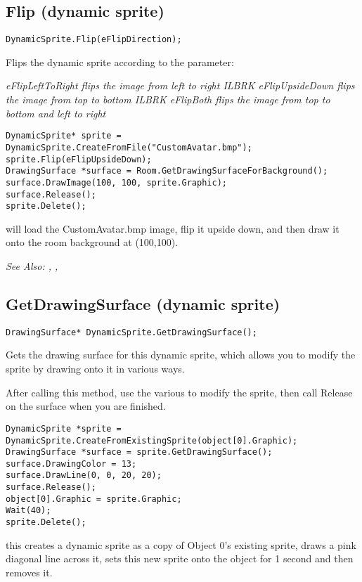\subsection{Flip (dynamic sprite)}\label{DynamicSprite.Flip}%

\begin{verbatim}
DynamicSprite.Flip(eFlipDirection);
\end{verbatim}
Flips the dynamic sprite according to the parameter:

\it{eFlipLeftToRight} flips the image from left to right ILBRK
\it{eFlipUpsideDown} flips the image from top to bottom ILBRK
\it{eFlipBoth} flips the image from top to bottom and left to right

\begin{verbatim}
DynamicSprite* sprite = DynamicSprite.CreateFromFile("CustomAvatar.bmp");
sprite.Flip(eFlipUpsideDown);
DrawingSurface *surface = Room.GetDrawingSurfaceForBackground();
surface.DrawImage(100, 100, sprite.Graphic);
surface.Release();
sprite.Delete();
\end{verbatim}
will load the CustomAvatar.bmp image, flip it upside down, and then
draw it onto the room background at (100,100).

\it{See Also:} ,
,


\subsection{GetDrawingSurface (dynamic sprite)}\label{DynamicSprite.GetDrawingSurface}%

\begin{verbatim}
DrawingSurface* DynamicSprite.GetDrawingSurface();
\end{verbatim}
Gets the drawing surface for this dynamic sprite, which allows you to modify the sprite by
drawing onto it in various ways.

After calling this method, use the various  to modify the
sprite, then call Release on the surface when you are finished.

\begin{verbatim}
DynamicSprite *sprite = DynamicSprite.CreateFromExistingSprite(object[0].Graphic);
DrawingSurface *surface = sprite.GetDrawingSurface();
surface.DrawingColor = 13;
surface.DrawLine(0, 0, 20, 20);
surface.Release();
object[0].Graphic = sprite.Graphic;
Wait(40);
sprite.Delete();
\end{verbatim}
this creates a dynamic sprite as a copy of Object 0's existing sprite, draws
a pink diagonal line across it, sets this new sprite onto the object for 1 second
and then removes it.

